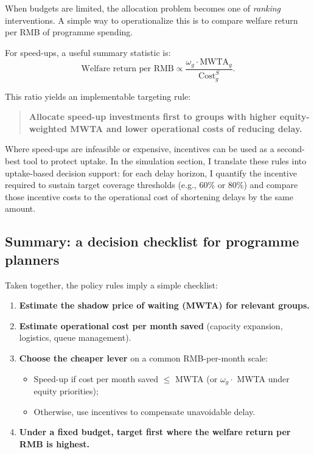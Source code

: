 \documentclass[doublespacing]{utdthesis}
\begin{document}
When budgets are limited, the allocation problem becomes one of \emph{ranking} interventions. A simple way to operationalize this is to compare welfare return per RMB of programme spending.

For speed-ups, a useful summary statistic is:
\begin{equation}
\text{Welfare return per RMB} \propto \frac{\omega_g \cdot \text{MWTA}_g}{\text{Cost}^{S}_g}.
\label{eq:bang_for_buck_policy}
\end{equation}

This ratio yields an implementable targeting rule:

\begin{quote}
\textbf{Allocate speed-up investments first to groups with higher equity-weighted MWTA and lower operational costs of reducing delay.}
\end{quote}

Where speed-ups are infeasible or expensive, incentives can be used as a second-best tool to protect uptake. In the simulation section, I translate these rules into uptake-based decision support: for each delay horizon, I quantify the incentive required to sustain target coverage thresholds (e.g., 60\% or 80\%) and compare those incentive costs to the operational cost of shortening delays by the same amount.



\subsection{Summary: a decision checklist for programme planners}
\label{subsec:essay3_checklist}

Taken together, the policy rules imply a simple checklist:

\begin{enumerate}
\item \textbf{Estimate the shadow price of waiting (MWTA) for relevant groups.}
\item \textbf{Estimate operational cost per month saved} (capacity expansion, logistics, queue management).
\item \textbf{Choose the cheaper lever} on a common RMB-per-month scale:
\begin{itemize}
\item Speed-up if cost per month saved $\le$ MWTA (or $\omega_g \cdot$ MWTA under equity priorities);
\item Otherwise, use incentives to compensate unavoidable delay.
\end{itemize}
\item \textbf{Under a fixed budget, target first where the welfare return per RMB is highest.}
\end{enumerate}
\end{document}
